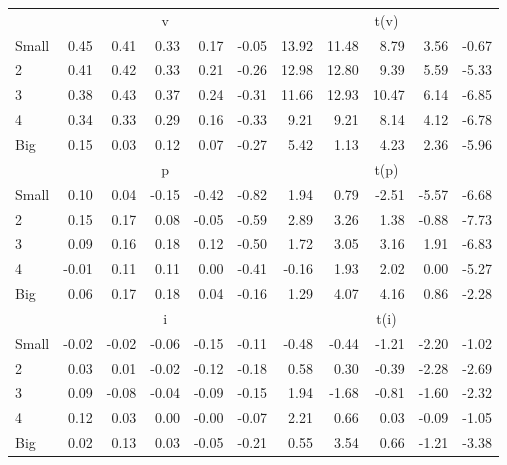 \begin{table}[!ht]
\begin{tabular}{lrrrrrrrrrr}
  
     & \multicolumn{5}{c}{v} & \multicolumn{5}{c}{t(v)}   \\
     \cmidrule(r){2-6} \cmidrule(r){7-11} 
    Small  & 0.45  & 0.41  & 0.33  & 0.17  & -0.05  & 13.92  & 11.48  & 8.79  & 3.56  & -0.67   \\
    2  & 0.41  & 0.42  & 0.33  & 0.21  & -0.26  & 12.98  & 12.80  & 9.39  & 5.59  & -5.33   \\
    3  & 0.38  & 0.43  & 0.37  & 0.24  & -0.31  & 11.66  & 12.93  & 10.47  & 6.14  & -6.85   \\
    4  & 0.34  & 0.33  & 0.29  & 0.16  & -0.33  & 9.21  & 9.21  & 8.14  & 4.12  & -6.78   \\
    Big  & 0.15  & 0.03  & 0.12  & 0.07  & -0.27  & 5.42  & 1.13  & 4.23  & 2.36  & -5.96   \\
    
  
     & \multicolumn{5}{c}{p} & \multicolumn{5}{c}{t(p)}   \\
     \cmidrule(r){2-6} \cmidrule(r){7-11} 
    Small  & 0.10  & 0.04  & -0.15  & -0.42  & -0.82  & 1.94  & 0.79  & -2.51  & -5.57  & -6.68   \\
    2  & 0.15  & 0.17  & 0.08  & -0.05  & -0.59  & 2.89  & 3.26  & 1.38  & -0.88  & -7.73   \\
    3  & 0.09  & 0.16  & 0.18  & 0.12  & -0.50  & 1.72  & 3.05  & 3.16  & 1.91  & -6.83   \\
    4  & -0.01  & 0.11  & 0.11  & 0.00  & -0.41  & -0.16  & 1.93  & 2.02  & 0.00  & -5.27   \\
    Big  & 0.06  & 0.17  & 0.18  & 0.04  & -0.16  & 1.29  & 4.07  & 4.16  & 0.86  & -2.28   \\
    
  
     & \multicolumn{5}{c}{i} & \multicolumn{5}{c}{t(i)}   \\
     \cmidrule(r){2-6} \cmidrule(r){7-11} 
    Small  & -0.02  & -0.02  & -0.06  & -0.15  & -0.11  & -0.48  & -0.44  & -1.21  & -2.20  & -1.02   \\
    2  & 0.03  & 0.01  & -0.02  & -0.12  & -0.18  & 0.58  & 0.30  & -0.39  & -2.28  & -2.69   \\
    3  & 0.09  & -0.08  & -0.04  & -0.09  & -0.15  & 1.94  & -1.68  & -0.81  & -1.60  & -2.32   \\
    4  & 0.12  & 0.03  & 0.00  & -0.00  & -0.07  & 2.21  & 0.66  & 0.03  & -0.09  & -1.05   \\
    Big  & 0.02  & 0.13  & 0.03  & -0.05  & -0.21  & 0.55  & 3.54  & 0.66  & -1.21  & -3.38   \\
    
  
  \bottomrule
\end{tabular}
\label{tbl:25_Size_RVar_F16}
\end{table}